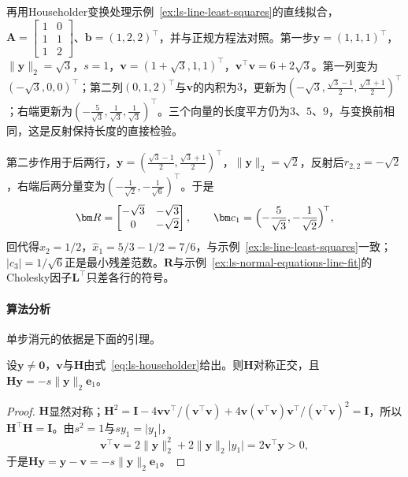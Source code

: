 \begin{example}[直线拟合的Householder三角化]
\label{ex:ls-householder-line-fit}
再用Householder变换处理示例~\ref{ex:ls-line-least-squares}的直线拟合，$\bm A=\left[\begin{smallmatrix}1&0\\1&1\\1&2\end{smallmatrix}\right]$、$\bm b=(1,2,2)^\top$，并与正规方程法对照。第一步$\bm y=(1,1,1)^\top$，$\lVert\bm y\rVert_2=\sqrt3$，$s=1$，$\bm v=(1+\sqrt3,1,1)^\top$，$\bm v^\top\bm v=6+2\sqrt3$。第一列变为$(-\sqrt3,0,0)^\top$；第二列$(0,1,2)^\top$与$\bm v$的内积为$3$，更新为$(-\sqrt3,\tfrac{\sqrt3-1}2,\tfrac{\sqrt3+1}2)^\top$；右端更新为$(-\tfrac5{\sqrt3},\tfrac1{\sqrt3},\tfrac1{\sqrt3})^\top$。三个向量的长度平方仍为$3$、$5$、$9$，与变换前相同，这是反射保持长度的直接检验。

第二步作用于后两行，$\bm y=(\tfrac{\sqrt3-1}2,\tfrac{\sqrt3+1}2)^\top$，$\lVert\bm y\rVert_2=\sqrt2$，反射后$r_{2,2}=-\sqrt2$，右端后两分量变为$(-\tfrac1{\sqrt2},-\tfrac1{\sqrt6})^\top$。于是
\[
 \bm R=\begin{bmatrix}-\sqrt3&-\sqrt3\\0&-\sqrt2\end{bmatrix},\qquad
 \bm c_1=\Bigl(-\frac5{\sqrt3},-\frac1{\sqrt2}\Bigr)^{\!\top},
\]
回代得$\hat x_2=1/2$，$\hat x_1=5/3-1/2=7/6$，与示例~\ref{ex:ls-line-least-squares}一致；$\lvert c_3\rvert=1/\sqrt6$正是最小残差范数。$\bm R$与示例~\ref{ex:ls-normal-equations-line-fit}的Cholesky因子$\bm L^\top$只差各行的符号。
\end{example}

\paragraph{算法分析}
单步消元的依据是下面的引理。

\begin{lemma}[Householder反射]
\label{lem:ls-householder-reflection}
设$\bm y\neq\bm0$，$\bm v$与$\bm H$由式~\eqref{eq:ls-householder}给出。则$\bm H$对称正交，且$\bm H\bm y=-s\lVert\bm y\rVert_2\bm e_1$。
\end{lemma}
\begin{proof}
$\bm H$显然对称；$\bm H^2=\bm I-4\bm v\bm v^\top/(\bm v^\top\bm v)+4\bm v(\bm v^\top\bm v)\bm v^\top/(\bm v^\top\bm v)^2=\bm I$，所以$\bm H^\top\bm H=\bm I$。由$s^2=1$与$sy_1=\lvert y_1\rvert$，
\[
 \bm v^\top\bm v=2\lVert\bm y\rVert_2^2+2\lVert\bm y\rVert_2\lvert y_1\rvert=2\bm v^\top\bm y>0,
\]
于是$\bm H\bm y=\bm y-\bm v=-s\lVert\bm y\rVert_2\bm e_1$。
\end{proof}

